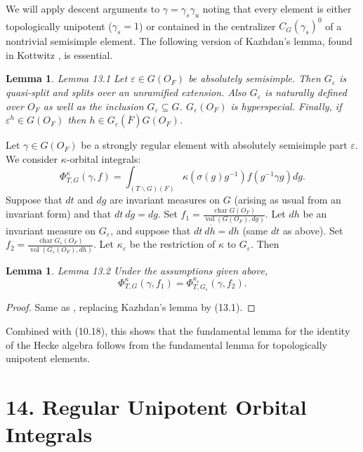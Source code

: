 \documentclass[11pt]{amsart}
\theoremstyle{plain}
\newtheorem{lemma}[theorem]{Lemma}
\theoremstyle{definition}
\def\Char{\operatorname{char}}               %
\def\Vol{\operatorname{vol}}
\def\HALESU{9}
\def\KOTTWITZS{16}
\begin{document}
We will apply descent arguments to $\gamma=\gamma_s\gamma_u$
noting that every element is either topologically unipotent ($\gamma_s=1$) 
or contained in the centralizer $C_G(\gamma_s)^0$
of a nontrivial semisimple element.  The following version of Kazhdan's lemma,
found in
Kottwitz \cite{\KOTTWITZS}, is essential. 
\begin{lemma}{Lemma 13.1}  Let $\varepsilon\in G(O_F)$ be
absolutely semisimple. Then $G_{\varepsilon}$ is quasi-split
and splits over an unramified extension.  Also $G_{\varepsilon}$
is naturally defined over $O_F$ as well as the inclusion $G_\varepsilon\subseteq G$.
$G_{\varepsilon}(O_F)$ is hyperspecial.  Finally, if $\varepsilon^h\in G(O_F)$ then
$h\in G_\varepsilon(\overline F) G(O_F)$.
\end{lemma}

Let $\gamma\in G(O_F)$ be a strongly
regular element with absolutely semisimple part $\varepsilon$.  
We consider $\kappa$-orbital integrals:
$$
\Phi_{T,G}^\kappa(\gamma,f)
=\int_{(T\backslash G)(F)}
\kappa(\sigma(g)g^{-1})
f(g^{-1}\gamma g)d\dot g.
$$
Suppose that $dt$ and $dg$ are invariant measures on $G$
(arising as usual from an invariant form) and that
$dt\ d\dot g = dg$. Set
$f_1=\frac{\Char G(O_F)}{\Vol(G(O_F),dg)}$.
Let $dh$ be an invariant measure on $G_{\varepsilon}$, and suppose
that $dt\ d\dot h = dh$ (same $dt$ as above). Set
$f_2=\frac{\Char G_{\varepsilon}(O_F)}{\Vol(G_{\varepsilon}(O_F),dh)}$.
Let $\kappa_\varepsilon$ be the restriction of $\kappa$ to $G_\varepsilon$.  Then
\begin{lemma}{Lemma 13.2}  Under the assumptions given above,
$$
\Phi_{T,G}^\kappa(\gamma,f_1) = \Phi_{T,G_\varepsilon}^{\kappa_\varepsilon}(\gamma,f_2).
$$
\end{lemma}

\begin{proof}  Same as \cite{\HALESU}, replacing Kazhdan's lemma by (13.1).
\end{proof}

Combined with (10.18), this shows that the fundamental lemma for the identity of the
Hecke algebra follows from the fundamental lemma for topologically unipotent elements.

\vskip3pc
\section{14. Regular Unipotent Orbital Integrals}
\end{document}
